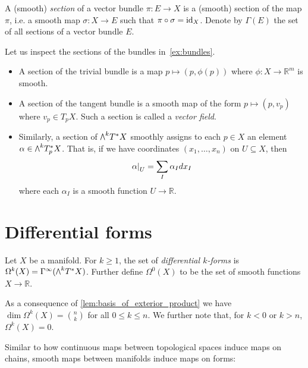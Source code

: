 \documentclass{article}
\begin{document}
\begin{definition}
  A  (smooth) \emph{section} of a vector bundle $\pi:E\to X$ is a (smooth)
  section of the map $\pi$, i.e. a smooth map $\sigma : X\to E$ such that $\pi
  \circ \sigma = \operatorname{id}_X$. Denote by $\Gamma(E)$ the set of all sections of
  a vector bundle $E$.
\end{definition}

\begin{example}
  Let us inspect the sections of the bundles in~\ref{ex:bundles}.
  \begin{itemize}
    \item A section of the trivial bundle is a map $p\mapsto (p,\phi(p))$ where $\phi:X\to\mathbb{R}^m$ is smooth.
    \item A section of the tangent bundle is a smooth map of the form
      $p\mapsto (p,v_p)$ where $v_p\in T_p X$. Such a section is called
      a \emph{vector field}.
    \item Similarly, a section of $\exterior{k}{T^* X}$ smoothly assigns to each
      $p\in X$ an element $\alpha\in\exterior{k}{T^*_p X}$. That is,
      if we have coordinates $(x_1,\ldots,x_n)$ on $U\subseteq X$,
      then
      \begin{align}\label{eq:local_differential_form}
        \left.{\alpha}\right\vert_{U} = \sum_I \alpha_I dx_I
      \end{align}
      where each $\alpha_I$ is a smooth function $U\to \mathbb{R}$.
  \end{itemize}
\end{example}

\section{Differential forms}

\begin{definition}
  Let $X$ be a manifold. For $k\geq 1$, the set of \emph{differential
  $k$-forms} is $\Omega^k(X) = \Gamma^\infty(\exterior{k}{T^* X})$.
  Further define $\Omega^0(X)$ to be the set of smooth functions
  $X\to\mathbb{R}$.
\end{definition}

As a consequence of \ref{lem:basis_of_exterior_product} we have
$\dim\Omega^k(X)=\binom{n}{k}$ for all $0\leq k\leq n$. We further
note that, for $k<0$ or $k>n$, $\Omega^k(X)=0$.

Similar to how continuous maps between topological spaces induce
maps on chains, smooth maps between manifolds induce maps on forms:
\end{document}
